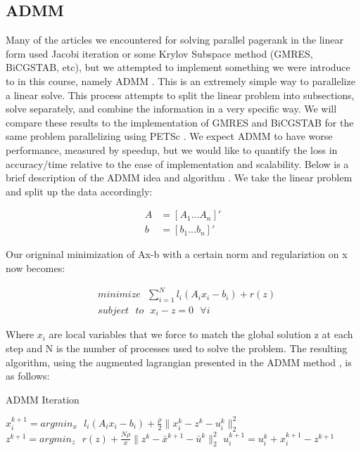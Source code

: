 \documentclass[letterpaper,12pt,onecolumn]{article}
\begin{document}
\subsection{ADMM}

Many of the articles we encountered for solving parallel pagerank in the linear form used Jacobi iteration or some Krylov Subspace method (GMRES, BiCGSTAB, etc), but we attempted to implement something we were introduce to in this course, namely ADMM \cite{ADMM}. This is an extremely simple way to parallelize a linear solve. This process attempts to split the linear problem into subsections, solve separately, and combine the information in a very specific way. 
We will compare these results to the implementation of GMRES and BiCGSTAB for the same problem parallelizing using PETSc \cite{Power Law Graphs}. We expect ADMM to have worse performance, measured by speedup, but we would like to quantify the loss in accuracy/time relative to the ease of implementation and scalability.
\newline
\linebreak
Below is a brief description of the ADMM idea and algorithm \cite{ADMM}.
\newline
We take the linear problem and split up the data accordingly:
\begin{center}
\begin{align}
	A &= \left[ A_{1} ... A_{n} \right]' \\
	b &= \left[ b_{1} ... b_{n} \right]' 
\end{align}
\end{center}
Our origninal minimization of Ax-b with a certain norm and regulariztion on x now becomes:

\begin{center}
\begin{align}
	&minimize \: \: \: \sum_{i=1}^{N} l_{i}(A_{i}x_{i} - b_{i}) + r(z) \\
	&subject \: \: \: to \: \: \: x_{i} - z = 0 \: \: \: \forall i
\end{align}
\end{center}
Where $x_{i}$ are local variables that we force to match the global solution z at each step and N is the number of processes used to solve the problem.
\newline
The resulting algorithm, using the augmented lagrangian presented in the ADMM method \cite{ADMM}, is as follows:

\begin{center}
\begin{algorithm}
\caption{ADMM Iteration}
\begin{algorithmic}[1]
	\STATE $x_{i}^{k+1} = argmin_{x} \: \: \: l_{i}(A_{i}x_{i} - b_{i}) + \frac{\rho}{2} \| x_{i}^{k} - z^{k} - u_{i}^{k} \|_{2}^{2}$ 
	\STATE $z^{k+1} = argmin_{z} \: \: \: r(z) + \frac{N \rho}{x} \| z^{k} - \bar{x}^{k+1} - \bar{u}^{k} \|_{2}^{2} $
	\STATE $u_{i}^{k+1} = u_{i}^{k} + x_{i}^{k+1} - z^{k+1} $ 
  \end{algorithmic}
\end{algorithm}
\end{center}
\end{document}
